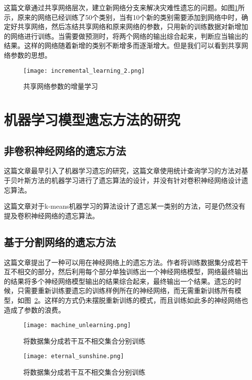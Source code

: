 这篇文章\cite{Sarwar_2020}通过共享网络层次，建立新网络分支来解决灾难性遗忘的问题。如图\ref{fig:incremental_learning_2}所示，原来的网络已经训练了50个类别，当有10个新的类别需要添加到网络中时，确定好共享网络，然后冻结共享网络和原来网络的参数，只用新的训练数据对新增加的网络进行训练。当需要做预测时，将两个网络的输出综合起来，判断应当输出的结果。这样的网络随着新增的类别不断增多而逐渐增大。但是我们可以看到共享网络参数的思想。
\begin{figure}
    \centering
    \texttt{[image: incremental\_learning\_2.png]}
    \caption{共享网络参数的增量学习\cite{Sarwar_2020}}
    \label{fig:incremental_learning_2}
\end{figure}

\section{机器学习模型遗忘方法的研究}
\subsection{非卷积神经网络的遗忘方法}
这篇文章\cite{yinzhicao2015}最早引入了机器学习遗忘的研究，这篇文章使用统计查询学习的方法对基于贝叶斯方法的机器学习进行了遗忘算法的设计，并没有针对卷积神经网络设计遗忘算法。

这篇文章\cite{antonio2019}对于k-means机器学习的算法设计了遗忘某一类别的方法，可是仍然没有提及卷积神经网络的遗忘算法。

\subsection{基于分割网络的遗忘方法}
这篇文章\cite{2019arXiv191203817B}提出了一种可以用在神经网络上的遗忘方法。作者将训练数据集分成若干互不相交的部分，然后利用每个部分单独训练出一个神经网络模型，网络最终输出的结果将多个神经网络模型输出的结果综合起来，最终输出一个结果。遗忘的时候，只需要重新训练要遗忘的训练样例所在的神经网络，而无需重新训练所有模型，如图~\ref{fig:machine_unlearning}。这样的方式仍未摆脱重新训练的模式，而且训练如此多的神经网络也造成了参数的浪费。
\begin{figure}
    \centering
    \texttt{[image: machine\_unlearning.png]}
    \caption{将数据集分成若干互不相交集合分别训练\cite{2019arXiv191203817B}}
    \label{fig:machine_unlearning}
\end{figure}
\begin{figure}
    \centering
    \texttt{[image: eternal\_sunshine.png]}
    \caption{将数据集分成若干互不相交集合分别训练\cite{2019arXiv191203817B}}
    \label{fig:eternal_sunshine}
\end{figure}
